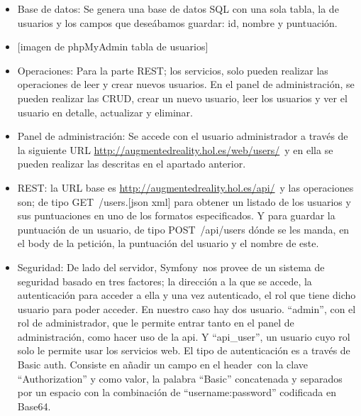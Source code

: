 \documentclass[]{article}
\begin{document}
\begin{itemize}
\itemsep1pt\parskip0pt
\item
  Base de datos: Se genera una base de datos SQL con una sola tabla, la
  de usuarios y los campos que deseábamos guardar: id, nombre y
  puntuación.
\item
  {[}imagen de phpMyAdmin tabla de usuarios{]}
\item
  Operaciones: Para la parte REST; los servicios, solo pueden realizar
  las operaciones de leer y crear nuevos usuarios. En el panel de
  administración, se pueden realizar las CRUD, crear un nuevo usuario,
  leer los usuarios y ver el usuario en detalle, actualizar y eliminar.
\item
  Panel de administración: Se accede con el usuario administrador a
  través de la siguiente URL
  \href{https://www.google.com/url?q=http://augmentedreality.hol.es/web/users/\&sa=D\&ust=1464799690127000\&usg=AFQjCNGoTkjRzj7Cigk_Eycmo5Kp9tVzyA}{http://augmentedreality.hol.es/web/users/}~y
  en ella se pueden realizar las descritas en el apartado anterior.
\item
  REST: la URL base es
  \href{https://www.google.com/url?q=http://augmentedreality.hol.es/api/\&sa=D\&ust=1464799690128000\&usg=AFQjCNHy0MPDl_4cBnnxwHjLI1fgilZRmg}{http://augmentedreality.hol.es/api/}~y
  las operaciones son; de tipo GET~/users.{[}json \textbar{} xml{]} para
  obtener un listado de los usuarios y sus puntuaciones en uno de los
  formatos especificados. Y para guardar la puntuación de un usuario, de
  tipo POST~/api/users dónde se les manda, en el body de la petición, la
  puntuación del usuario y el nombre de este.
\item
  Seguridad: De lado del servidor, Symfony~nos provee de un sistema de
  seguridad basado en tres factores; la dirección a la que se accede, la
  autenticación para acceder a ella y una vez autenticado, el rol que
  tiene dicho usuario para poder acceder. En nuestro caso hay dos
  usuario. ``admin'', con el rol de administrador, que le permite entrar
  tanto en el panel de administración, como hacer uso de la api. Y
  ``api\_user'', un usuario cuyo rol solo le permite usar los servicios
  web. El tipo de autenticación es a través de Basic auth. Consiste en
  añadir un campo en el header~con la clave ``Authorization'' y como
  valor, la palabra ``Basic'' concatenada y separados por un espacio con
  la combinación de ``username:password'' codificada en Base64.
\end{itemize}
\end{document}
